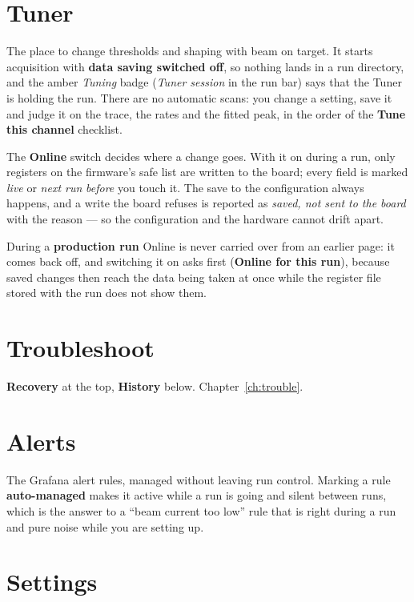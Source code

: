 \documentclass[11pt,a4paper]{report}
\newcommand{\ui}[1]{\textbf{#1}}          %
\begin{document}
\section{Tuner}

The place to change thresholds and shaping with beam on target. It starts
acquisition with \textbf{data saving switched off}, so nothing lands in a run
directory, and the amber \emph{Tuning} badge (\emph{Tuner session} in the run
bar) says that the Tuner is holding the run. There are no automatic scans: you
change a setting, save it and judge it on the trace, the rates and the fitted
peak, in the order of the \ui{Tune this channel} checklist.

\label{sec:duringrun}
The \ui{Online} switch decides where a change goes. With it on during a run, only
registers on the firmware's safe list are written to the board; every field is
marked \emph{live} or \emph{next run} \emph{before} you touch it. The save to the
configuration always happens, and a write the board refuses is reported as
\emph{saved, not sent to the board} with the reason --- so the configuration and
the hardware cannot drift apart.

During a \textbf{production run} Online is never carried over from an earlier
page: it comes back off, and switching it on asks first (\ui{Online for this
run}), because saved changes then reach the data being taken at once while the
register file stored with the run does not show them.

\section{Troubleshoot}

\ui{Recovery} at the top, \ui{History} below. Chapter~\ref{ch:trouble}.

\section{Alerts}

The Grafana alert rules, managed without leaving run control. Marking a rule
\textbf{auto-managed} makes it active while a run is going and silent between
runs, which is the answer to a ``beam current too low'' rule that is right during
a run and pure noise while you are setting up.

\section{Settings}
\end{document}
